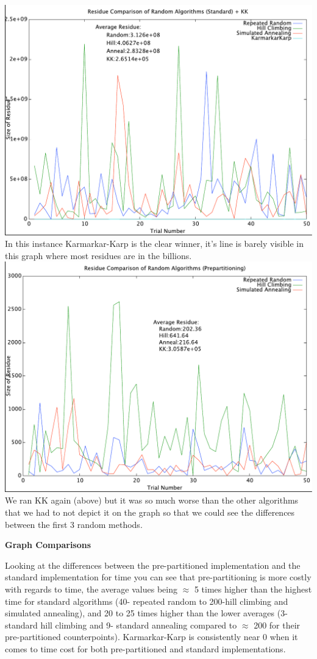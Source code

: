 \documentclass[12pt]{article}
\begin{document}
 \includegraphics[scale=0.8]{true_values.pdf} 
 \noindent In this instance Karmarkar-Karp is the clear winner, it's line is barely visible in this graph where most residues are in the billions.
\\
 \includegraphics[scale=0.8]{false_values.pdf} 
 \\
 \noindent We ran KK again (above) but it was so much worse than the other algorithms that we had to not depict it on the graph so that we could see the differences between the first 3 random methods.  
 \medskip
 
 \noindent \textbf{Graph Comparisons}
 \medskip
 
 \noindent Looking at the differences between the pre-partitioned implementation and the standard implementation for time you can see that pre-partitioning is more costly with regards to time, the average values being $\approx$ 5 times higher than the highest time for standard algorithms (40- repeated random to 200-hill climbing and simulated annealing), and 20 to 25 times higher than the lower averages (3- standard hill climbing and 9- standard annealing compared to $\approx$ 200 for their pre-partitioned counterpoints).  Karmarkar-Karp is consistently near 0 when it comes to time cost for both pre-partitioned and standard implementations.
 \bigskip
 
\end{document}
